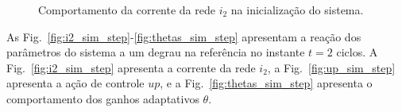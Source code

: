 	\begin{figure}[!htb]
    \centering
      \def\svgwidth{\textwidth}
      
    \renewcommand\figurename{Fig.}
    \caption{Comportamento da corrente da rede $i_2$ na inicialização do sistema.}
    \label{fig:i2_sim_ini}
  \end{figure}

  \newpage

  \vfill
  \noindent
  \begin{minipage}{\textwidth}
    \makebox[\textwidth]{
      \centering
      \def\svgwidth{\textwidth}
      }
    \label{fig:up_sim_ini}
  \end{minipage}

  \vfill
  \noindent
  \begin{minipage}{\textwidth}
    \makebox[\textwidth]{
      \centering
      \def\svgwidth{\textwidth}
      }
    \label{fig:thetas_sim_ini}
  \end{minipage}

  \newpage

  As Fig.~\ref{fig:i2_sim_step}-\ref{fig:thetas_sim_step} apresentam a reação dos parâmetros do sistema a um degrau na referência no instante $t=2$ ciclos. A Fig.~\ref{fig:i2_sim_step} apresenta a corrente da rede $i_2$, a Fig.~\ref{fig:up_sim_step} apresenta a ação de controle $up$, e a Fig.~\ref{fig:thetas_sim_step} apresenta o comportamento dos ganhos adaptativos $\theta$.

  \vfill
  \noindent
  \begin{minipage}{\textwidth}
    \makebox[\textwidth]{
      \centering
      \def\svgwidth{\textwidth}
      }
    \label{fig:i2_sim_step}
  \end{minipage}

  \vfill

  \newpage

  \vfill
  \noindent
  \begin{minipage}{\textwidth}
    \makebox[\textwidth]{
      \centering
      \def\svgwidth{\textwidth}
      }
    \label{fig:up_sim_step}
  \end{minipage}


